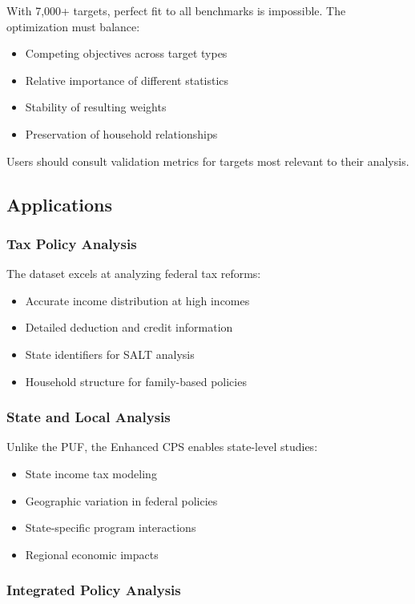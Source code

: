 With 7,000+ targets, perfect fit to all benchmarks is impossible. The optimization must balance:
\begin{itemize}
\item Competing objectives across target types
\item Relative importance of different statistics
\item Stability of resulting weights
\item Preservation of household relationships
\end{itemize}

Users should consult validation metrics for targets most relevant to their analysis.

\subsection{Applications}

\subsubsection{Tax Policy Analysis}

The dataset excels at analyzing federal tax reforms:
\begin{itemize}
\item Accurate income distribution at high incomes
\item Detailed deduction and credit information
\item State identifiers for SALT analysis
\item Household structure for family-based policies
\end{itemize}

\subsubsection{State and Local Analysis}

Unlike the PUF, the Enhanced CPS enables state-level studies:
\begin{itemize}
\item State income tax modeling
\item Geographic variation in federal policies
\item State-specific program interactions
\item Regional economic impacts
\end{itemize}

\subsubsection{Integrated Policy Analysis}

